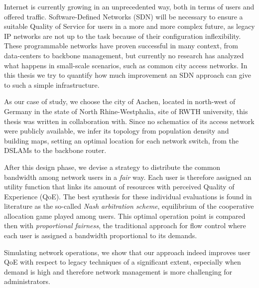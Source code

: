 
Internet is currently growing in an unprecedented way, both in terms of users
and offered traffic.%
%
Software-Defined Networks (SDN) will be necessary to ensure a suitable Quality
of Service for users in a more and more complex future, as legacy IP networks
are not up to the task because of their configuration inflexibility.%
%
These programmable networks have proven successful in many context, from
data-centers to backbone management, but currently no research has analyzed what
happens in small-scale scenarios, such as common city access networks. In this
thesis we try to quantify how much improvement an SDN approach can give to such
a simple infrastructure.

\smallskip

As our case of study, we choose the city of Aachen, located in north-west of
Germany in the state of North Rhine-Westphalia, site of RWTH university, this
thesis was written in collaboration with. %
%
Since no schematics of its access network were publicly available, we infer its
topology from population density and building maps, setting an optimal location
for each network switch, from the DSLAMs to the backbone router.


After this design phase, we devise a strategy to distribute the common bandwidth
among network users in a \emph{fair} way. %
%
Each user is therefore assigned an utility function that links its amount of
resources with perceived Quality of Experience (QoE).%
%
The best synthesis for these individual evaluations is found in literature as
the so-called \emph{Nash arbitration scheme}, equilibrium of the cooperative
allocation game played among users.%
%
This optimal operation point is compared then with \emph{proportional fairness},
the traditional approach for flow control where each user is assigned a
bandwidth proportional to its demands.

Simulating network operations, we show that our approach indeed improves user
QoE with respect to legacy techniques of a significant extent, especially when
demand is high and therefore network management is more challenging for
administrators.

